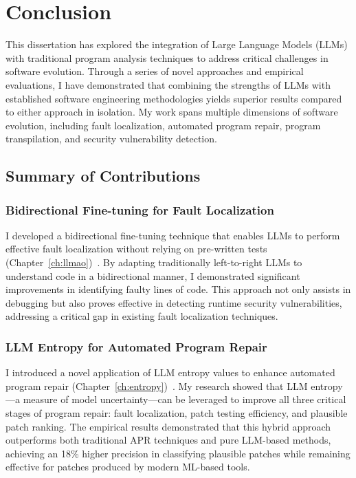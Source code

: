 \chapter{Conclusion}
\label{sec:conclusion}

This dissertation has explored the integration of Large Language Models (LLMs) with traditional program analysis techniques to address critical challenges in software evolution. Through a series of novel approaches and empirical evaluations, I have demonstrated that combining the strengths of LLMs with established software engineering methodologies yields superior results compared to either approach in isolation. My work spans multiple dimensions of software evolution, including fault localization, automated program repair, program transpilation, and security vulnerability detection.

\section{Summary of Contributions}

\subsection{Bidirectional Fine-tuning for Fault Localization}

I developed a bidirectional fine-tuning technique that enables LLMs to perform effective fault localization without relying on pre-written tests (Chapter~\ref{ch:llmao})~\cite{Llmao}. By adapting traditionally left-to-right LLMs to understand code in a bidirectional manner, I demonstrated significant improvements in identifying faulty lines of code. This approach not only assists in debugging but also proves effective in detecting runtime security vulnerabilities, addressing a critical gap in existing fault localization techniques.

\subsection{LLM Entropy for Automated Program Repair}

I introduced a novel application of LLM entropy values to enhance automated program repair (Chapter~\ref{ch:entropy})~\cite{yang2024revisiting}. My research showed that LLM entropy—a measure of model uncertainty—can be leveraged to improve all three critical stages of program repair: fault localization, patch testing efficiency, and plausible patch ranking. The empirical results demonstrated that this hybrid approach outperforms both traditional APR techniques and pure LLM-based methods, achieving an 18\% higher precision in classifying plausible patches while remaining effective for patches produced by modern ML-based tools.


